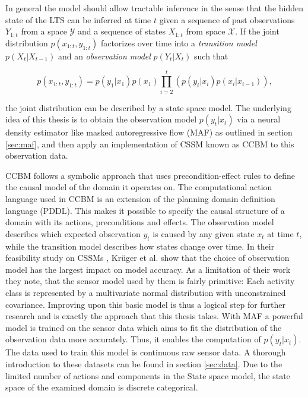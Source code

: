\documentclass[11pt,titlepage,oneside,openany]{book}
\begin{document}
In general the model should allow tractable inference in the sense that the hidden state of the LTS can be inferred at time $t$ given a sequence of past observations $Y_{1:t}$ from a space $\mathcal{Y}$ and a sequence of states $X_{1:t}$ from space $\mathcal{X}$. If the joint distribution $p(x_{1:t}, y_{1:t})$ factorizes over time into a \emph{transition model} $p(X_t|X_{t-1})$ and an \emph{observation model} $p(Y_t|X_t)$ such that

\begin{equation}
	\label{func:ssm}
	p(x_{1:t}, y_{1:t}) = p(y_1|x_1)p(x_1) \prod_{i=2}^{t} (p(y_i|x_i)p(x_i|x_{i-1})),
\end{equation}

\noindent the joint distribution can be described by a state space model. The underlying idea of this thesis is to obtain the observation model $p(y_t|x_t)$ via a neural density estimator like masked autoregressive flow (MAF) as outlined in section \ref{sec:maf}, and then apply an implementation of CSSM known as CCBM to this observation data.   

CCBM follows a symbolic approach that uses precondition-effect rules to define the causal model of the domain it operates on. The computational action language used in CCBM is an extension of the planning domain definition language (PDDL). This makes it possible to specify the causal structure of a domain with its actions, preconditions and effects. The observation model describes which expected observation $y_t$ is caused by any given state $x_t$ at time $t$, while the transition model describes how states change over time. In their feasibility study on CSSMs \cite{kruger_computational_2014}, Kr\"uger et al. show that the choice of observation model has the largest impact on model accuracy. As a limitation of their work they note, that the sensor model used by them is fairly primitive: Each activity class is represented by a multivariate normal distribution with unconstrained covariance. Improving upon this basic model is thus a logical step for further research and is exactly the approach that this thesis takes. With MAF a powerful model is trained on the sensor data which aims to fit the distribution of the observation data more accurately. Thus, it enables the computation of $p(y_t|x_t)$. The data used to train this model is continuous raw sensor data. A thorough introduction to these datasets can be found in section \ref{sec:data}. Due to the limited number of actions and components in the State space model, the state space of the examined domain is discrete categorical.
\end{document}
